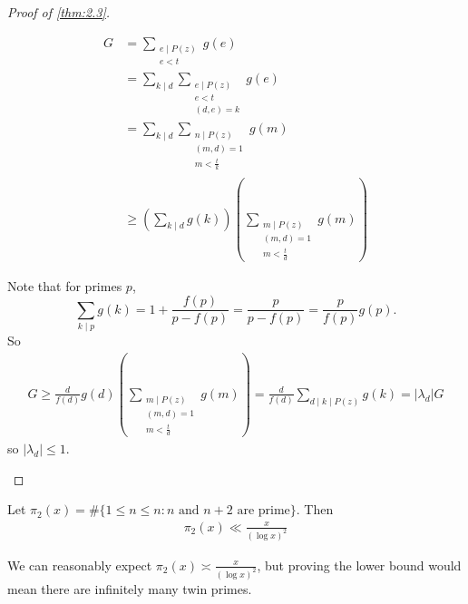 \documentclass{article}
\newcommand{\1}{\mathbbm{1}}
\begin{document}
\begin{proof}[Proof of \cref{thm:2.3}]
\begin{enumerate}
    \begin{align*}
      G &= \sum_{\substack{e \mid P(z) \\ e<t}} g(e) \\
        &= \sum_{k \mid d} \sum_{\substack{e \mid P(z) \\ e < t \\ (d,e)=k}} g(e) \\
        &= \sum_{k \mid d} \sum_{\substack{n \mid P(z) \\ (m,d) = 1 \\ m < \frac{t}{k}}} g(m) \\
        &\geq \left(\sum_{k \mid d} g(k)\right) \left(\sum_{\substack{m \mid P(z) \\ (m,d) = 1 \\ m < \frac{t}{d}}} g(m)\right)
    \end{align*}

    Note that for primes $p$,
    \begin{equation*}
      \sum_{k \mid p} g(k) = 1 + \frac{f(p)}{p - f(p)} = \frac{p}{p - f(p)} = \frac{p}{f(p)} g(p).
    \end{equation*}
    So
    \begin{align*}
      G \geq \frac{d}{f(d)} g(d) \left(\sum_{\substack{m \mid P(z) \\ (m,d) = 1 \\ m < \frac{t}{d}}} g(m)\right) = \frac{d}{f(d)} \sum_{d \mid k \mid P(z)} g(k) = |\lambda_d| G
    \end{align*}
  so $|\lambda_d| \leq 1$. \qedhere
\end{enumerate}
\end{proof}
\begin{nthm}[Brun]\label{thm:2.5}
  Let $\pi_2(x) = \# \{1 \leq n \leq n : n \text{ and } n+2 \text{ are prime}\}$.
  Then
  \begin{align*}
    \pi_2(x) \ll \frac{x}{(\log x)^2}
  \end{align*}
\end{nthm}
We can reasonably expect $\pi_2(x) \asymp \frac{x}{(\log x)^2}$, but proving the lower bound would mean there are infinitely many twin primes.
\end{document}
